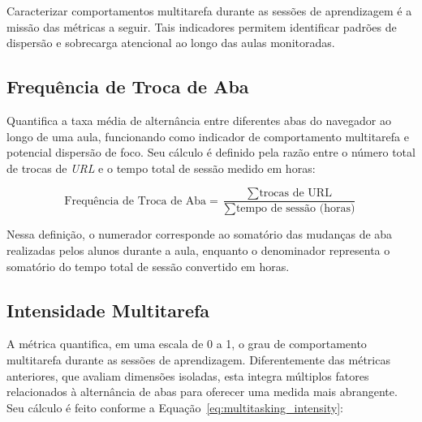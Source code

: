 Caracterizar comportamentos multitarefa durante as sessões de aprendizagem é a missão das métricas a seguir. Tais indicadores permitem identificar padrões de dispersão e sobrecarga atencional ao longo das aulas monitoradas.

\subsection{Frequência de Troca de Aba}
Quantifica a taxa média de alternância entre diferentes abas do navegador ao longo de uma aula, funcionando como indicador de comportamento multitarefa e potencial dispersão de foco. Seu cálculo é definido pela razão entre o número total de trocas de \textit{URL} e o tempo total de sessão medido em horas:

\begin{equation}\label{eq:tab_switch_frequency}
\text{Frequência de Troca de Aba} = \frac{\sum \text{trocas de URL}}{\sum \text{tempo de sessão (horas)}}
\end{equation}

Nessa definição, o numerador corresponde ao somatório das mudanças de aba realizadas pelos alunos durante a aula, enquanto o denominador representa o somatório do tempo total de sessão convertido em horas. 


% 

\subsection{Intensidade Multitarefa}
A métrica quantifica, em uma escala de 0 a 1, o grau de comportamento multitarefa durante as sessões de aprendizagem. Diferentemente das métricas anteriores, que avaliam dimensões isoladas, esta integra múltiplos fatores relacionados à alternância de abas para oferecer uma medida mais abrangente. Seu cálculo é feito conforme a Equação~\ref{eq:multitasking_intensity}:

